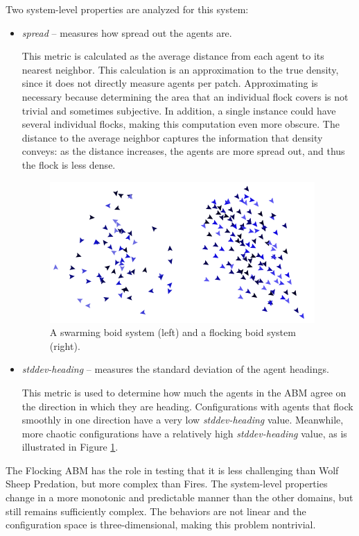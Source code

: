 Two system-level properties are analyzed for this system:
\begin{itemize}
\item \textit{spread} -- measures how spread out the agents are.

This metric is calculated as the average distance from each agent to its nearest neighbor.
This calculation is an approximation to the true density, since it does not directly measure agents per patch.
Approximating is necessary because determining the area that an individual flock covers is not trivial and sometimes subjective.
In addition, a single instance could have several individual flocks, making this computation even more obscure.
The distance to the average neighbor captures the information that density conveys: as the distance increases, the agents are more spread out, and thus the flock is less dense.

\begin{figure}[ht]
\centering
\includegraphics[scale=1]{images/swarmVSflock.png}
\caption{A swarming boid system (left) and a flocking boid system (right).}
\label{fig:swarmVSflock}
\end{figure}

\item \textit{stddev-heading} -- measures the standard deviation of the agent headings.

This metric is used to determine how much the agents in the ABM agree on the direction in which they are heading.
Configurations with agents that flock smoothly in one direction have a very low \textit{stddev-heading} value.
Meanwhile, more chaotic configurations have a relatively high \textit{stddev-heading} value, as is illustrated in Figure \ref{fig:swarmVSflock}.

\end{itemize}

The Flocking ABM has the role in testing \fw that it is less challenging than Wolf Sheep Predation, but more complex than Fires.
The system-level properties change in a more monotonic and predictable manner than the other domains, but still remains sufficiently complex.
The behaviors are not linear and the configuration space is three-dimensional, making this problem nontrivial. 

